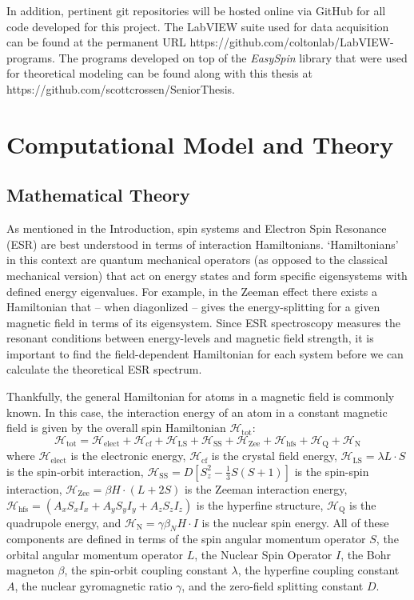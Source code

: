 \documentclass[oneside, astronomy, noacknowlegments]{BYUPhys}
\begin{document}
In addition, pertinent git repositories will be hosted online via GitHub for all code developed for this project. The LabVIEW suite used for data acquisition can be found at the permanent URL https://github.com/coltonlab/LabVIEW-programs. The programs developed on top of the \textit{EasySpin} library that were used for theoretical modeling can be found along with this thesis at https://github.com/scottcrossen/SeniorThesis.










\chapter{Computational Model and Theory}

\section{Mathematical Theory}

As mentioned in the Introduction, spin systems and Electron Spin Resonance (ESR) are best understood in terms of interaction Hamiltonians. `Hamiltonians' in this context are quantum mechanical operators (as opposed to the classical mechanical version) that act on energy states and form specific eigensystems with defined energy eigenvalues. For example, in the Zeeman effect there exists a Hamiltonian that -- when diagonlized -- gives the energy-splitting for a given magnetic field in terms of its eigensystem. Since ESR spectroscopy measures the resonant conditions between energy-levels and magnetic field strength, it is important to find the field-dependent Hamiltonian for each system before we can calculate the theoretical ESR spectrum.

Thankfully, the general Hamiltonian for atoms in a magnetic field is commonly known. In this case, the interaction energy of an atom in a constant magnetic field is given by the overall spin Hamiltonian $\mathcal{H}_{\text{tot}}$: $$\mathcal{H}_{\text{tot}} = \mathcal{H}_{\text{elect}} + \mathcal{H}_{\text{cf}} + \mathcal{H}_{\text{LS}} + \mathcal{H}_{\text{SS}} + \mathcal{H}_{\text{Zee}} + \mathcal{H}_{\text{hfs}} + \mathcal{H}_{\text{Q}} + \mathcal{H}_{\text{N}}$$ where $\mathcal{H}_{\text{elect}}$ is the electronic energy, $\mathcal{H}_{\text{cf}}$ is the crystal field energy, $\mathcal{H}_{\text{LS}} = \lambda L \cdot S$ is the spin-orbit interaction, $\mathcal{H}_{\text{SS}} = D \left[ S_{z}^{2} - \frac{1}{3} S (S+1) \right]$ is the spin-spin interaction, $\mathcal{H}_{\text{Zee}} = \beta H \cdot (L+2S)$ is the Zeeman interaction energy, $\mathcal{H}_{\text{hfs}} = \left(A_xS_xI_x + A_yS_yI_y + A_zS_zI_z\right)$ is the hyperfine structure, $\mathcal{H}_{\text{Q}}$ is the quadrupole energy, and $\mathcal{H}_{\text{N}} = \gamma \beta_{N} H \cdot I$ is the nuclear spin energy. All of these components are defined in terms of the spin angular momentum operator $S$, the orbital angular momentum operator $L$, the Nuclear Spin Operator $I$, the Bohr magneton $\beta$, the spin-orbit coupling constant $\lambda$, the hyperfine coupling constant $A$, the nuclear gyromagnetic ratio $\gamma$, and the zero-field splitting constant $D$.
\end{document}
